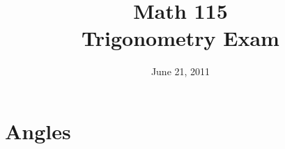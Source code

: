 \documentclass[fleqn,addpoints]{exam}
\title{Math 115 \\ Trigonometry Exam}
\date{June 21, 2011}
\author{}
\begin{document}
\maketitle  

\ifprintanswers
\else
\vspace{0.2in}
\vspace{0.2in}

\begin{center}
\gradetable[h][pages]
\end{center}

\vspace{1 cm}

\fi

\section{Angles}
\end{document}
